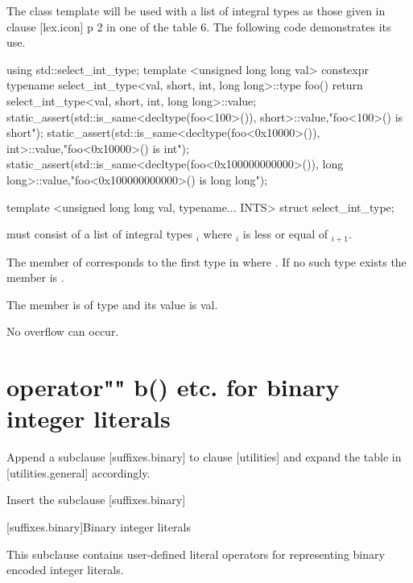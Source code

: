 \documentclass[ebook,11pt,article]{memoir}
\begin{document}
\enterexample
The class template will be used with a list of integral types as those given in clause [lex.icon] p 2 in one of the table 6. The following code demonstrates its use.
\begin{codeblock}
using std::select_int_type;
template <unsigned long long val>
constexpr
typename select_int_type<val,
short, int, long long>::type
foo() {
    return  select_int_type<val,
            short, int, long long>::value;
}
static_assert(std::is_same<decltype(foo<100>()), short>::value,"foo<100>() is short");
static_assert(std::is_same<decltype(foo<0x10000>()), int>::value,"foo<0x10000>() is int");
static_assert(std::is_same<decltype(foo<0x100000000000>()), long long>::value,"foo<0x100000000000>() is long long");
\end{codeblock}

\exitexample
\begin{itemdecl}
template <unsigned long long val, typename... INTS>
struct select_int_type;
\end{itemdecl}

\begin{itemdescr}
\pnum
\requires
{} must consist of a list of integral types $_i$ where $_i$ is less or equal of $_{i+1}$.

\pnum
\effects
The member  of  corresponds to the first type  in  where . If no such type exists the member  is .

\pnum
The member  is of type  and its value is {val}.

\enternote
No overflow can occur.
\exitnote 

\end{itemdescr}
\section{operator"" b() etc. for binary integer literals}
Append a subclause [suffixes.binary] to clause [utilities] and expand the table in [utilities.general] accordingly.

Insert the subclause [suffixes.binary]

[suffixes.binary]{Binary integer literals}

\pnum
This subclause contains user-defined literal operators for representing binary encoded integer literals.
\end{document}
